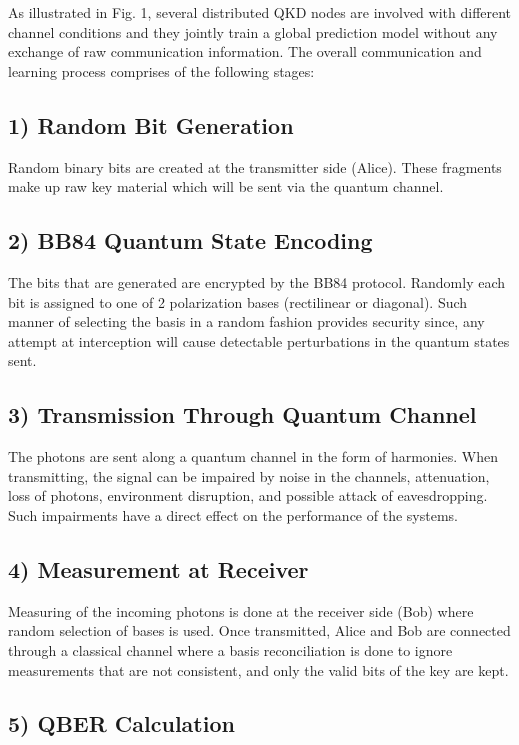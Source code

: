 \documentclass[conference]{IEEEtran}
\begin{document}
As illustrated in Fig. 1, several distributed QKD nodes are involved with different channel conditions and they jointly train a global prediction model without any exchange of raw communication information. The overall communication and learning process comprises of the following stages: 

\subsection*{1) Random Bit Generation}

Random binary bits are created at the transmitter side (Alice). These fragments make up raw key material which will be sent via the quantum channel.  

\subsection*{2) BB84 Quantum State Encoding}

The bits that are generated are encrypted by the BB84 protocol. Randomly each bit is assigned to one of 2 polarization bases (rectilinear or diagonal). Such manner of selecting the basis in a random fashion provides security since, any attempt at interception will cause detectable perturbations in the quantum states sent. 

\subsection*{3) Transmission Through Quantum Channel}

The photons are sent along a quantum channel in the form of harmonies. When transmitting, the signal can be impaired by noise in the channels, attenuation, loss of photons, environment disruption, and possible attack of eavesdropping. Such impairments have a direct effect on the performance of the systems. 

\subsection*{4) Measurement at Receiver}

Measuring of the incoming photons is done at the receiver side (Bob) where random selection of bases is used. Once transmitted, Alice and Bob are connected through a classical channel where a basis reconciliation is done to ignore measurements that are not consistent, and only the valid bits of the key are kept. 

\subsection*{5) QBER Calculation}
\end{document}
